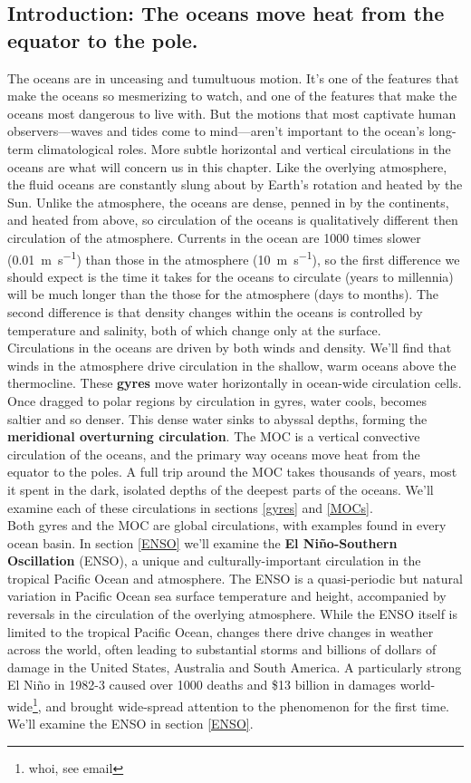 {\subsection{Introduction: The oceans move heat from the equator to the pole.}
The oceans are in unceasing and tumultuous motion. It's one of the features that make the oceans so mesmerizing to watch, and one of the features that make the oceans most dangerous to live with. But the motions that most captivate human observers---waves and tides come to mind---aren't important to the ocean's long-term climatological roles. More subtle horizontal and vertical circulations in the oceans are what will concern us in this chapter. Like the overlying atmosphere, the fluid oceans are constantly slung about by Earth's rotation and heated by the Sun. Unlike the atmosphere, the oceans are dense, penned in by the continents, and heated from above, so circulation of the oceans is qualitatively different then circulation of the atmosphere. Currents in the ocean are 1000 times slower (\SI{0.01}{\metre\per\second}) than those in the atmosphere (\SI{10}{\metre\per\second}), so the first difference we should expect is the time it takes for the oceans to circulate (years to millennia) will be much longer than the those for the atmosphere (days to months). The second difference is that density changes within the oceans is controlled by temperature and salinity, both of which change only at the surface.\\
Circulations in the oceans are driven by both winds and density. We'll find that winds in the atmosphere drive circulation in the shallow, warm oceans above the thermocline. These \textbf{gyres} move water horizontally in ocean-wide circulation cells. Once dragged to polar regions by circulation in gyres, water cools, becomes saltier and so denser. This dense water sinks to abyssal depths, forming the \textbf{meridional overturning circulation}. The MOC is a vertical convective circulation of the oceans, and the primary way oceans move heat from the equator to the poles. A full trip around the MOC takes thousands of years, most it spent in the dark, isolated depths of the deepest parts of the oceans. We'll examine each of these circulations in sections \ref{gyres} and \ref{MOCs}.\\
Both gyres and the MOC are global circulations, with examples found in every ocean basin. In section \ref{ENSO} we'll examine the \textbf{El Ni\~no-Southern Oscillation} (ENSO), a unique and culturally-important circulation in the tropical Pacific Ocean and atmosphere. The ENSO is a quasi-periodic but natural variation in Pacific Ocean sea surface temperature and height, accompanied by reversals in the circulation of the overlying atmosphere. While the ENSO itself is limited to the tropical Pacific Ocean, changes there drive changes in weather across the world, often leading to substantial storms and billions of dollars of damage in the United States, Australia and South America. A particularly strong El Ni\~no in 1982-3 caused over 1000 deaths and \$13 billion in damages world-wide\footnote{whoi, see email}, and brought wide-spread attention to the phenomenon for the first time. We'll examine the ENSO in section \ref{ENSO}.      
}

